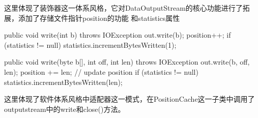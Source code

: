 这里体现了装饰器这一体系风格，它对DataOutputStream的核心功能进行了拓展，添加了存储文件指针position的功能
和statistics属性
\begin{java}
public void write(int b) throws IOException {
  out.write(b);
  position++;
  if (statistics != null) {
    statistics.incrementBytesWritten(1);
  }
}

public void write(byte b[], int off, int len) throws IOException {
  out.write(b, off, len);
  position += len;                            // update position
  if (statistics != null) {
    statistics.incrementBytesWritten(len);
  }
}
\end{java}
这里体现了软件体系风格中适配器这一模式，在PositionCache这一子类中调用了outputstream中的write和close()方法。


\endinput

